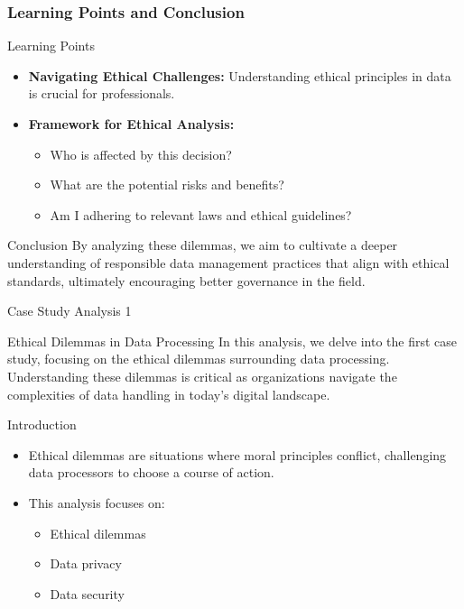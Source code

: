 \documentclass[aspectratio=169]{beamer}
\begin{document}
\begin{frame}[fragile]
    \frametitle{Learning Points and Conclusion}

    \begin{block}{Learning Points}
        \begin{itemize}
            \item \textbf{Navigating Ethical Challenges:} Understanding ethical principles in data is crucial for professionals.
            \item \textbf{Framework for Ethical Analysis:}
                \begin{itemize}
                    \item Who is affected by this decision?
                    \item What are the potential risks and benefits?
                    \item Am I adhering to relevant laws and ethical guidelines?
                \end{itemize}
        \end{itemize}
    \end{block}

    \begin{block}{Conclusion}
        By analyzing these dilemmas, we aim to cultivate a deeper understanding of responsible data management practices that align with ethical standards, ultimately encouraging better governance in the field.
    \end{block}
\end{frame}

\begin{frame}[fragile]{Case Study Analysis 1}
  \begin{block}{Ethical Dilemmas in Data Processing}
    In this analysis, we delve into the first case study, focusing on the ethical dilemmas surrounding data processing. Understanding these dilemmas is critical as organizations navigate the complexities of data handling in today's digital landscape.
  \end{block}
\end{frame}

\begin{frame}[fragile]{Introduction}
  \begin{itemize}
    \item Ethical dilemmas are situations where moral principles conflict, challenging data processors to choose a course of action.
    \item This analysis focuses on:
    \begin{itemize}
      \item Ethical dilemmas
      \item Data privacy
      \item Data security
    \end{itemize}
  \end{itemize}
\end{frame}
\end{document}
